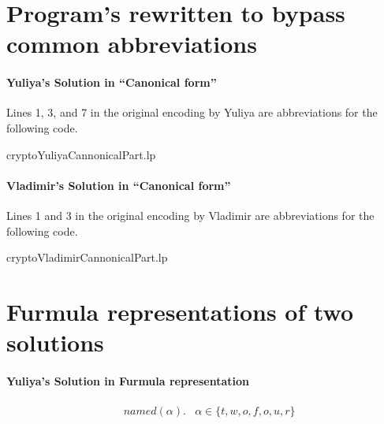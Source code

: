 \documentclass{article}
\begin{document}
\section{Program's rewritten to bypass common abbreviations}

    \paragraph{Yuliya's Solution in ``Canonical form''}

    Lines 1, 3, and 7 in the original encoding by Yuliya are abbreviations for the following code.
     
{cryptoYuliyaCannonicalPart.lp}

    \paragraph{Vladimir's Solution in ``Canonical form''}
        Lines 1 and 3 in the original encoding by Vladimir are abbreviations for the following code.

 
{cryptoVladimirCannonicalPart.lp}

\section{Furmula representations    of two solutions}
\paragraph{Yuliya's Solution in Furmula representation}

\begin{align}
&named(\alpha). & \alpha\in \{t,w,o,f,o,u,r\} \\
\end{align}



\end{document}
